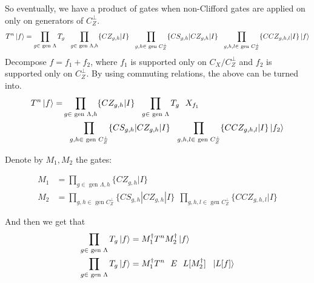 \documentclass[manuscript,screen,review]{acmart}
\begin{document}
So eventually, we have a product of gates when non-Clifford gates are applied on only on generators of $C_{Z}^{\perp}$.
\begin{equation*}
  \begin{split}
    T^{n}\ket{f} = \prod_{g \in \text{ gen }\Lambda} T_{g} \ \ \prod_{g \in \text{ gen }\Lambda, h} \{ CZ_{g,h} | I \} \ \ \prod_{g ,h \in \text{ gen }C_{Z}^{\perp}} \{ CS_{g,h} | CZ_{g,h} | I \} \ \ \prod_{g ,h, l \in \text{ gen }C_{Z}^{\perp}} \{ CCZ_{g,h,l} | I \} \ket{f}
  \end{split}
\end{equation*}
Decompose $f = f_{1} + f_{2}$, where $f_{1}$ is supported only on $C_{X}/C^{\perp}_{Z}$ and $f_{2}$ is supported only on $C_{Z}^{\perp}$. By using commuting relations, the above can be turned into.
\begin{equation*}
  \begin{split}
    T^{n}\ket{f} = & \prod_{g \in \text{ gen }\Lambda, h} \{ CZ_{g,h} | I \} \ \ \prod_{g \in \text{ gen }\Lambda} T_{g} \ \  X_{f_{1}} \\
    &  \ \ \prod_{g ,h \in \text{ gen }C_{Z}^{\perp}} \{ CS_{g,h} | CZ_{g,h} | I \} \ \ \prod_{g ,h, l \in \text{ gen }C_{Z}^{\perp}} \{ CCZ_{g,h,l} | I \} \ket{f_2}
  \end{split}
\end{equation*}

Denote by $M_1, M_2$ the gates: 

\begin{equation*}
  \begin{split}
    M_{1} &= \prod_{g \in \text{ gen } \Lambda, h} \{ CZ_{g,h} | I \} \\
    M_{2} &= \prod_{g ,h \in \text{ gen } C_{Z}^{\perp}} \{ CS_{g,h} | CZ_{g,h} | I \} \ \ \prod_{g ,h, l \in \text{ gen } C_{Z}^{\perp}} \{ CCZ_{g,h,l} | I \}
  \end{split}
\end{equation*}

And then we get that
\begin{equation*}
  \begin{split}
    \prod_{g \in \text{ gen } \Lambda} T_{g} \ket{f} &=  M_{1}^{\dagger} T^{n}  M_{2}^{\dagger} \ket{f} \\
    \prod_{g \in \text{ gen }\Lambda} T_{g}\ket{f} &=  M_{1}^{\dagger} T^{n} \ \ E \ \ L[M_{2}^{\dagger}] \ \ \ket{L[f]}  
  \end{split}
\end{equation*}
\end{document}
